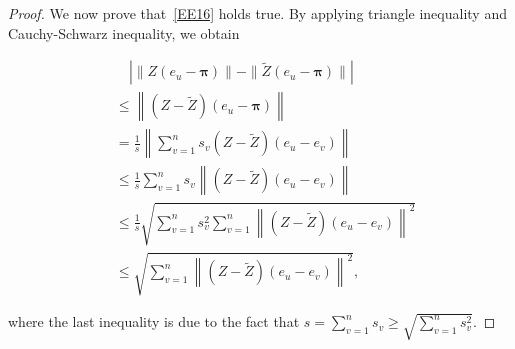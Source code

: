 \documentclass[sigconf]{acmart}
\def\abs#1{\left|#1  \right|}
\def\norm#1{\left\| #1 \right\|}
\newcommand\ppi{\boldsymbol{\pi}}
\newcommand\ee{\boldsymbol{\mathit{e}}}
\newcommand\ZZtil{\boldsymbol{\mathit{\tilde{Z}}}}
\newcommand\ZZ{\boldsymbol{\mathit{Z}}}
\begin{document}
\begin{proof}
	We now prove that~\eqref{EE16} holds true.  By applying triangle inequality and Cauchy-Schwarz inequality, we obtain
	\begin{small}
		\begin{align*}
			 & \quad \abs{\norm{\ZZ(\ee_u-\ppi)}-\|\ZZtil(\ee_u-\ppi)\|}                                     \\
			 & \le \norm{(\ZZ-\ZZtil)(\ee_u-\ppi)}                                                           \\
			 & = \frac{1}{s} \norm{\sum_{v=1}^{n} s_v (\ZZ-\ZZtil)(\ee_u-\ee_v)}                             \\
			 & \le \frac{1}{s} \sum_{v=1}^{n} s_v \norm{(\ZZ-\ZZtil)(\ee_u-\ee_v)}                           \\
			 & \le \frac{1}{s} \sqrt{\sum_{v=1}^{n} s_v^2 \sum_{v=1}^{n} \norm{(\ZZ-\ZZtil)(\ee_u-\ee_v)}^2} \\
			 & \le \sqrt{\sum_{v=1}^{n} \norm{(\ZZ-\ZZtil)(\ee_u-\ee_v)}^2},
		\end{align*}
	\end{small}
	where the last inequality is due to the fact that $s=\sum_{v=1}^{n} s_v\ge \sqrt{\sum_{v=1}^{n} s_v^2}$.


\end{proof}
\end{document}
